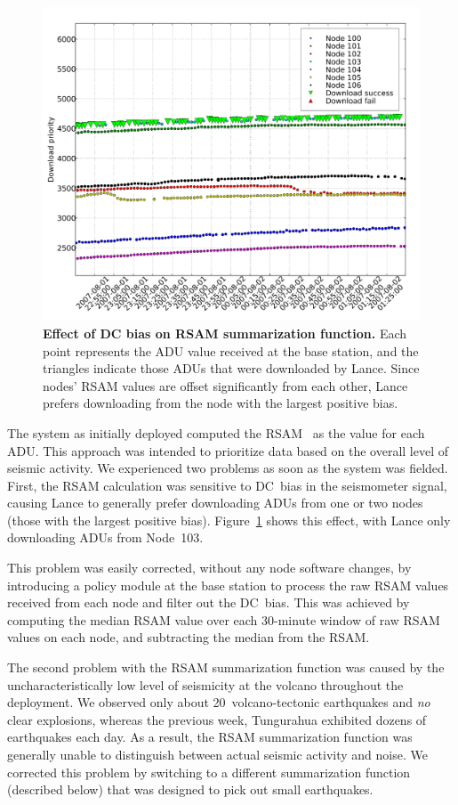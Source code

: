 \begin{figure}[t!]
\begin{center}
\includegraphics[width=0.8\hsize]{./4-lance/figs/dcbias.pdf}
\end{center}

\caption{\textbf{Effect of DC bias on RSAM summarization function.} Each
point represents the ADU value received at the base station, and the
triangles indicate those ADUs that were downloaded by Lance. Since nodes'
RSAM values are offset significantly from each other, Lance prefers
downloading from the node with the largest positive bias.}

\label{lance-fig-dcbias}
\end{figure}

The system as initially deployed computed the RSAM~\cite{rsam} as the value
for each ADU. This approach was intended to prioritize data based on the
overall level of seismic activity. We experienced two problems as soon as the
system was fielded. First, the RSAM calculation was sensitive to DC~bias in
the seismometer signal, causing Lance to generally prefer downloading ADUs
from one or two nodes (those with the largest positive bias).
Figure~\ref{lance-fig-dcbias} shows this effect, with Lance only downloading
ADUs from Node~103.

This problem was easily corrected, without any node software changes, by
introducing a policy module at the base station to process the raw RSAM
values received from each node and filter out the DC~bias. This was achieved
by computing the median RSAM value over each 30-minute window of raw RSAM
values on each node, and subtracting the median from the RSAM.

The second problem with the RSAM summarization function was caused by the
uncharacteristically low level of seismicity at the volcano throughout the
deployment. We observed only about 20~volcano-tectonic earthquakes and
\textit{no} clear explosions, whereas the previous week, Tungurahua exhibited
dozens of earthquakes each day. As a result, the RSAM summarization function
was generally unable to distinguish between actual seismic activity and
noise. We corrected this problem by switching to a different summarization
function (described below) that was designed to pick out small earthquakes.


